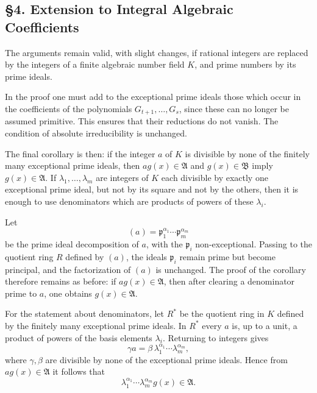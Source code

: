 \documentclass[11pt]{article}
\providecommand{\frakA}{\mathfrak A}
\providecommand{\frakB}{\mathfrak B}
\providecommand{\frakp}{\mathfrak p}
\begin{document}
\subsection*{§4. Extension to Integral Algebraic Coefficients}

The arguments remain valid, with slight changes, if rational integers are replaced by the integers of a finite algebraic number field \(K\), and prime numbers by its prime ideals.

In the proof one must add to the exceptional prime ideals those which occur in the coefficients of the polynomials \(G_{t+1},\ldots,G_s\), since these can no longer be assumed primitive. This ensures that their reductions do not vanish. The condition of absolute irreducibility is unchanged.

The final corollary is then: if the integer \(a\) of \(K\) is divisible by none of the finitely many exceptional prime ideals, then \(a g(x)\in\frakA\) and \(g(x)\in\frakB\) imply \(g(x)\in\frakA\). If \(\lambda_1,\ldots,\lambda_m\) are integers of \(K\) each divisible by exactly one exceptional prime ideal, but not by its square and not by the others, then it is enough to use denominators which are products of powers of these \(\lambda_i\).

Let
\[
        (a)=\frakp_1^{\alpha_1}\cdots\frakp_m^{\alpha_m}
\]
be the prime ideal decomposition of \(a\), with the \(\frakp_i\) non-exceptional. Passing to the quotient ring \(R\) defined by \((a)\), the ideals \(\frakp_i\) remain prime but become principal, and the factorization of \((a)\) is unchanged. The proof of the corollary therefore remains as before: if \(a g(x)\in\frakA\), then after clearing a denominator prime to \(a\), one obtains \(g(x)\in\frakA\).

For the statement about denominators, let \(R^*\) be the quotient ring in \(K\) defined by the finitely many exceptional prime ideals. In \(R^*\) every \(a\) is, up to a unit, a product of powers of the basis elements \(\lambda_i\). Returning to integers gives
\[
        \gamma a=\beta\,\lambda_1^{\alpha_1}\cdots\lambda_m^{\alpha_m},
\]
where \(\gamma,\beta\) are divisible by none of the exceptional prime ideals. Hence from \(a g(x)\in\frakA\) it follows that
\[
        \lambda_1^{\alpha_1}\cdots\lambda_m^{\alpha_m}g(x)\in\frakA.
\]
\end{document}
